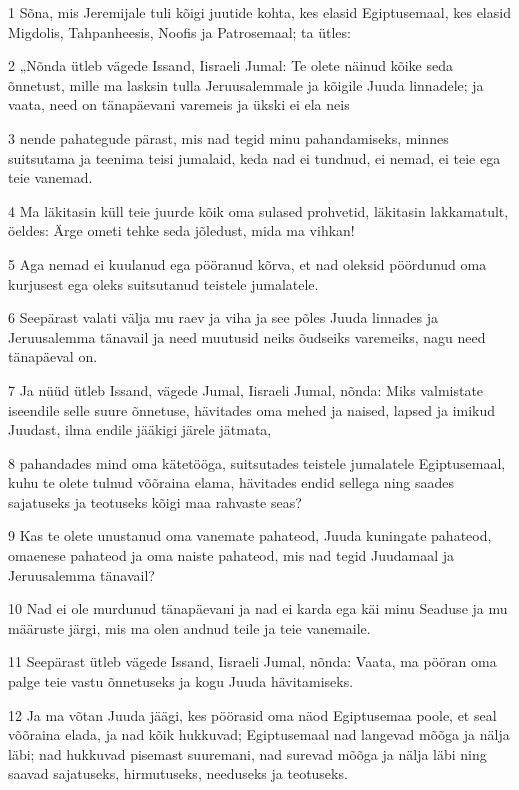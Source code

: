 \par 1 Sõna, mis Jeremijale tuli kõigi juutide kohta, kes elasid Egiptusemaal, kes elasid Migdolis, Tahpanheesis, Noofis ja Patrosemaal; ta ütles:
\par 2 „Nõnda ütleb vägede Issand, Iisraeli Jumal: Te olete näinud kõike seda õnnetust, mille ma lasksin tulla Jeruusalemmale ja kõigile Juuda linnadele; ja vaata, need on tänapäevani varemeis ja ükski ei ela neis
\par 3 nende pahategude pärast, mis nad tegid minu pahandamiseks, minnes suitsutama ja teenima teisi jumalaid, keda nad ei tundnud, ei nemad, ei teie ega teie vanemad.
\par 4 Ma läkitasin küll teie juurde kõik oma sulased prohvetid, läkitasin lakkamatult, öeldes: Ärge ometi tehke seda jõledust, mida ma vihkan!
\par 5 Aga nemad ei kuulanud ega pööranud kõrva, et nad oleksid pöördunud oma kurjusest ega oleks suitsutanud teistele jumalatele.
\par 6 Seepärast valati välja mu raev ja viha ja see põles Juuda linnades ja Jeruusalemma tänavail ja need muutusid neiks õudseiks varemeiks, nagu need tänapäeval on.
\par 7 Ja nüüd ütleb Issand, vägede Jumal, Iisraeli Jumal, nõnda: Miks valmistate iseendile selle suure õnnetuse, hävitades oma mehed ja naised, lapsed ja imikud Juudast, ilma endile jääkigi järele jätmata,
\par 8 pahandades mind oma kätetööga, suitsutades teistele jumalatele Egiptusemaal, kuhu te olete tulnud võõraina elama, hävitades endid sellega ning saades sajatuseks ja teotuseks kõigi maa rahvaste seas?
\par 9 Kas te olete unustanud oma vanemate pahateod, Juuda kuningate pahateod, omaenese pahateod ja oma naiste pahateod, mis nad tegid Juudamaal ja Jeruusalemma tänavail?
\par 10 Nad ei ole murdunud tänapäevani ja nad ei karda ega käi minu Seaduse ja mu määruste järgi, mis ma olen andnud teile ja teie vanemaile.
\par 11 Seepärast ütleb vägede Issand, Iisraeli Jumal, nõnda: Vaata, ma pööran oma palge teie vastu õnnetuseks ja kogu Juuda hävitamiseks.
\par 12 Ja ma võtan Juuda jäägi, kes pöörasid oma näod Egiptusemaa poole, et seal võõraina elada, ja nad kõik hukkuvad; Egiptusemaal nad langevad mõõga ja nälja läbi; nad hukkuvad pisemast suuremani, nad surevad mõõga ja nälja läbi ning saavad sajatuseks, hirmutuseks, needuseks ja teotuseks.
